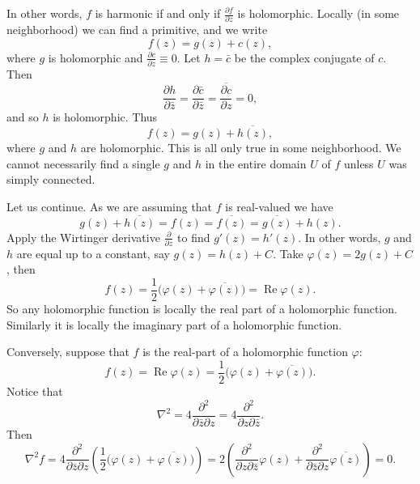 \documentclass[12pt,openany]{book}
\renewcommand{\Re}{\operatorname{Re}}
\theoremstyle{plain}
\theoremstyle{remark}
\theoremstyle{definition}
\theoremstyle{exercise}
\theoremstyle{example}
\begin{document}
In other words, $f$ is harmonic if and only if $\frac{\partial f}{\partial
z}$ is holomorphic.  Locally (in some neighborhood) we can find a
primitive, and we write
\begin{equation*}
f(z) = g(z) + c(z) ,
\end{equation*}
where $g$ is holomorphic and $\frac{\partial c}{\partial z} \equiv 0$.
Let $h = \bar{c}$ be the complex conjugate of $c$.  Then 
\begin{equation*}
\frac{\partial h}{\partial \bar{z}}
=
\frac{\partial \bar{c}}{\partial \bar{z}}
=
\overline{
\frac{\partial c}{\partial z}
}
=
0 ,
\end{equation*}
and so $h$ is holomorphic.  Thus
\begin{equation*}
f(z) = g(z) + \overline{h(z)} ,
\end{equation*}
where $g$ and $h$ are holomorphic.  This is all only true in some
neighborhood.  We cannot necessarily find a single $g$ and $h$ in the entire
domain $U$ of $f$ unless $U$ was simply connected.

Let us continue.  As we are assuming that $f$ is real-valued we have
\begin{equation*}
g(z) + \overline{h(z)} = f(z) = \overline{f(z)} = \overline{g(z)} + h(z).
\end{equation*}
Apply the Wirtinger derivative $\frac{\partial}{\partial z}$ to find
$g'(z) = h'(z)$.  In other words, $g$ and $h$ are equal up to a constant,
say $g(z) = h(z) + C$.  Take $\varphi(z) = 2 g(z) + C$, then
\begin{equation*}
f(z) = \frac{1}{2} \bigl( \varphi(z) + \overline{\varphi(z)} \bigr) 
= \Re \varphi(z).
\end{equation*}
So any holomorphic function is locally the real part of a holomorphic
function.  Similarly it is locally the imaginary part of a holomorphic
function.

Conversely,
suppose that $f$ is the real-part of a holomorphic function $\varphi$:
\begin{equation*}
f(z) = \Re \varphi(z) =
\frac{1}{2}\bigl( \varphi(z) + \overline{\varphi(z)} \bigr) .
\end{equation*}
Notice that
\begin{equation*}
\nabla^2 =
4 \frac{\partial^2}{\partial \bar{z} \partial z}
=
4 \frac{\partial^2}{\partial z \partial \bar{z}} .
\end{equation*}
Then
\begin{equation*}
\nabla^2 f =
4 \frac{\partial^2}{\partial \bar{z} \partial z}
\left(
\frac{1}{2}\bigl( \varphi(z) + \overline{\varphi(z)} \bigr)
\right)
=
2
\left(
\frac{\partial^2}{\partial z \partial \bar{z}}
\varphi(z) +
\frac{\partial^2}{\partial \bar{z} \partial z}
\overline{\varphi(z)}
\right)
=
0 .
\end{equation*}
\end{document}
